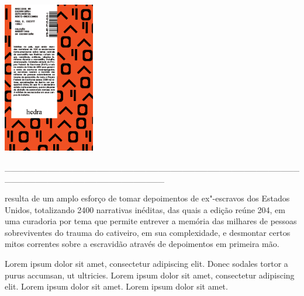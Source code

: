 \pagebreak

\hspace{.5cm}

\begin{center}
\hspace*{-3cm}
\hspace{2cm}\includegraphics[width=40mm]{./imgs/wpa.png}
\end{center}

\hspace*{-2cm}\_\_\_\_\_\_\_\_\_\_\_\_\_\_\_\_\_\_\_\_\_\_\_\_\_\_\_\_\_\_\_\_\_\_\_\_\_\_\_\_\_\_\_\_\_\_\_\_\_\_\_\_\_\_\_\_\_\_\_\_\_\_\_\_\_\_\_\_\_\_\_\_\_\_

\medskip

 resulta de um amplo esforço de tomar depoimentos de ex"-escravos dos Estados Unidos, totalizando 2400 narrativas inéditas, das quais a edição reúne 204, em uma curadoria por tema que permite entrever a memória das milhares de pessoas sobreviventes do trauma do cativeiro, em sua complexidade, e desmontar certos mitos correntes sobre a escravidão através de depoimentos em primeira mão.


\hspace{.5cm}

\hspace*{-.4cm}\begin{minipage}[c]{0.45\linewidth}
\small{
{}}
\end{minipage}
\begin{minipage}[c]{0.50\linewidth}
\small{Lorem ipsum dolor sit amet, consectetur adipiscing elit.
Donec sodales tortor a purus accumsan, ut ultricies. Lorem ipsum dolor sit amet, consectetur adipiscing elit. Lorem ipsum dolor sit amet. Lorem ipsum dolor sit amet.} 
\end{minipage}

